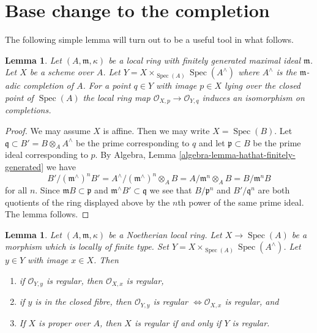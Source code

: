 \documentclass{stacks-project}
\theoremstyle{plain}
\newtheorem{lemma}[subsection]{Lemma}
\theoremstyle{definition}
\theoremstyle{remark}
\numberwithin{equation}{subsection}
\def\Spec{\mathop{\mathrm{Spec}}}
\begin{document}
\section{Base change to the completion}
\label{section-aux}

\noindent
The following simple lemma will turn out to be a useful tool in what follows.

\begin{lemma}
\label{lemma-iso-completions}
Let $(A, \mathfrak m, \kappa)$ be a local ring with finitely generated
maximal ideal $\mathfrak m$. Let $X$ be a scheme over $A$.
Let $Y = X \times_{\Spec(A)} \Spec(A^\wedge)$ where
$A^\wedge$ is the $\mathfrak m$-adic completion of $A$.
For a point $q \in Y$ with image $p \in X$ lying
over the closed point of $\Spec(A)$ the
local ring map $\mathcal{O}_{X, p} \to \mathcal{O}_{Y, q}$
induces an isomorphism on completions.
\end{lemma}

\begin{proof}
We may assume $X$ is affine. Then we may write $X = \Spec(B)$.
Let $\mathfrak q \subset B' = B \otimes_A A^\wedge$ be the
prime corresponding to $q$ and let $\mathfrak p \subset B$
be the prime ideal corresponding to $p$.
By Algebra, Lemma \ref{algebra-lemma-hathat-finitely-generated}
we have
$$
B'/(\mathfrak m^\wedge)^n B' =
A^\wedge/(\mathfrak m^\wedge)^n \otimes_A B =
A/\mathfrak m^n \otimes_A B = B/\mathfrak m^n B
$$
for all $n$. Since $\mathfrak m B \subset \mathfrak p$ and
$\mathfrak m^\wedge B' \subset \mathfrak q$ we see that
$B/\mathfrak p^n$ and $B'/\mathfrak q^n$ are both
quotients of the ring displayed above by the $n$th power
of the same prime ideal. The lemma follows.
\end{proof}

\begin{lemma}
\label{lemma-port-regularity-to-completion}
Let $(A, \mathfrak m, \kappa)$ be a Noetherian local ring.
Let $X \to \Spec(A)$ be a morphism which is locally of finite type.
Set $Y = X \times_{\Spec(A)} \Spec(A^\wedge)$. Let $y \in Y$ with
image $x \in X$. Then
\begin{enumerate}
\item if $\mathcal{O}_{Y, y}$ is regular, then $\mathcal{O}_{X, x}$
is regular,
\item if $y$ is in the closed fibre, then $\mathcal{O}_{Y, y}$ is regular
$\Leftrightarrow \mathcal{O}_{X, x}$ is regular, and
\item If $X$ is proper over $A$, then $X$ is regular
if and only if $Y$ is regular.
\end{enumerate}
\end{lemma}
\end{document}
